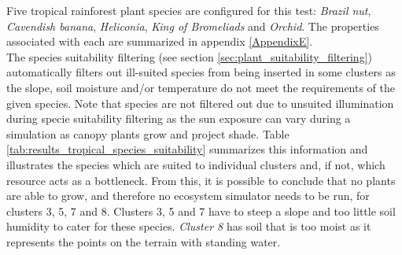 Five tropical rainforest plant species are configured for this test: \textit{Brazil nut}, \textit{Cavendish banana}, \textit{Heliconia}, \textit{King of Bromeliads} and \textit{Orchid}. The properties associated with each are summarized in appendix \ref{AppendixE}.\\

The species suitability filtering (see section \ref{sec:plant_suitability_filtering}) automatically filters out ill-suited species from being inserted in some clusters as the slope, soil moisture and/or temperature do not meet the requirements of the given species. Note that species are not filtered out due to unsuited illumination during specie suitability filtering as the sun exposure can vary during a simulation as canopy plants grow and project shade. Table \ref{tab:results_tropical_species_suitability} summarizes this information and illustrates the species which are suited to individual clusters and, if not, which resource acts as a bottleneck. From this, it is possible to conclude that no plants are able to grow, and therefore no ecosystem simulator needs to be run, for clusters 3, 5, 7 and 8. Clusters 3, 5 and 7 have to steep a slope and too little soil humidity to cater for these species. \textit{Cluster 8} has soil that is too moist as it represents the points on the terrain with standing water.\\


